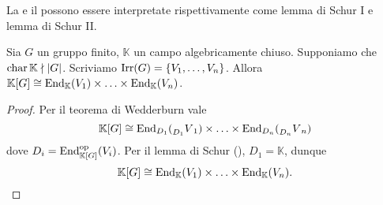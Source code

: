 La  e il  possono essere interpretate rispettivamente come lemma di Schur I e lemma di Schur II.


\begin{corollary}
Sia $G$ un gruppo finito, $\mathbb{K}$ un campo algebricamente chiuso. Supponiamo che $\operatorname{char}\mathbb{K}\nmid|G|$. Scriviamo $\operatorname{Irr}(G)=\{V_1,\ldots, V_n\}$. Allora $\mathbb{K}[G]\cong\operatorname{End}_\mathbb{K}(V_1)\times\ldots\times\operatorname{End}_\mathbb{K}(V_n)$.
\end{corollary}
\begin{proof}
Per il teorema di Wedderburn vale 
$$
\mathbb{K}[G]\cong\operatorname{End}_{D_1}(\prescript{}{D_1}{V}_1)\times\ldots\times\operatorname{End}_{D_n}(\prescript{}{D_n}{V}_n)
$$
dove $D_i=\operatorname{End}^{\operatorname{op}}_{\mathbb{K}[G]}(V_i)$. Per il lemma di Schur (), $D_1=\mathbb{K}$, dunque
$$
\mathbb{K}[G]\cong\operatorname{End}_\mathbb{K}(V_1)\times\ldots\times\operatorname{End}_\mathbb{K}(V_n).
$$
\end{proof}


